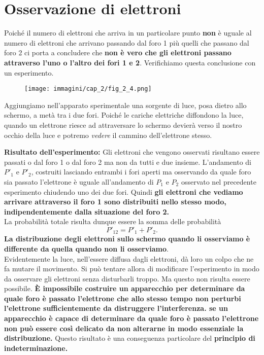 \documentclass[a4paper,12pt,oneside]{book}
\begin{document}
\section*{Osservazione di elettroni}
Poiché il numero di elettroni che arriva in un particolare punto \textbf{non} è uguale al numero di elettroni che arrivano passando dal foro 1 più quelli che passano dal foro 2 ci porta a concludere che \textbf{non è vero che gli elettroni passano attraverso l'uno o l'altro dei fori 1 e 2}. Verifichiamo questa conclusione con un esperimento.\\
\begin{figure}[!htbp]
\begin{center}
\texttt{[image: immagini/cap\_2/fig\_2\_4.png]}
\end{center}
\end{figure}

Aggiungiamo nell'apparato sperimentale una sorgente di luce, posa dietro allo schermo, a metà tra i due fori. Poiché le cariche elettriche diffondono la luce, quando un elettrone riesce ad attraversare lo schermo devierà verso il nostro occhio della luce e potremo \textit{vedere} il cammino dell'elettrone stesso.

\textbf{Risultato dell'esperimento:} Gli elettroni che vengono osservati risultano essere passati o dal foro 1 o dal foro 2 ma non da tutti e due insieme. L'andamento di $P'_1$ e $P'_2$, costruiti lasciando entrambi i fori aperti ma osservando da quale foro sia passato l'elettrone è uguale all'andamento di $P_1$ e $P_2$ osservato nel precedente esperimento chiudendo uno dei due fori. Quindi \textbf{gli elettroni che vediamo arrivare attraverso il foro 1 sono distribuiti nello stesso modo, indipendentemente dalla situazione del foro 2.}\\
La probabilità totale risulta dunque essere la somma delle probabilità
\begin{equation}
P'_{12}= P'_1 + P'_2.
\end{equation}
\textbf{La distribuzione degli elettroni sullo schermo quando li osserviamo è differente da quella quando non li osserviamo}.\\
Evidentemente la luce, nell'essere diffusa dagli elettroni, dà loro un colpo che ne fa mutare il movimento. Si può tentare allora di modificare l'esperimento in modo da osservare gli elettroni senza disturbarli troppo. Ma questo non risulta essere possibile. \textbf{È impossibile costruire un apparecchio per determinare da quale foro è passato l'elettrone che allo stesso tempo non perturbi l'elettrone sufficientemente da distruggere l'interferenza. se un apparecchio è capace di determinare da quale foro è passato l'elettrone  non può essere così delicato da non alterarne in modo essenziale la distribuzione.} Questo risultato è una conseguenza particolare del \textbf{principio di indeterminazione.}
\end{document}
